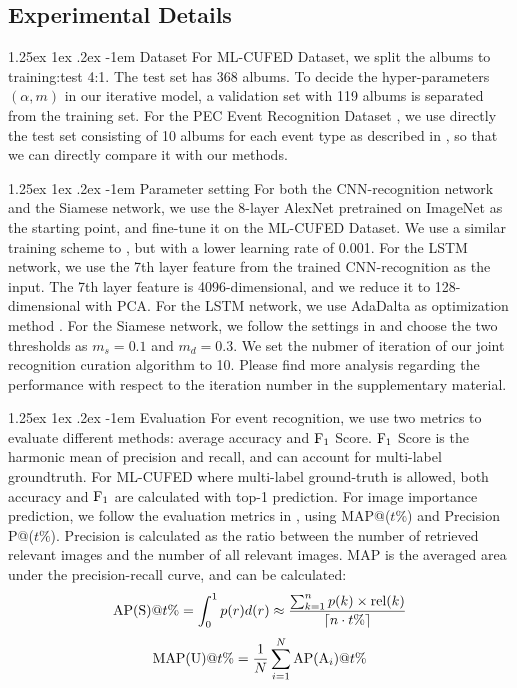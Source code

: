 \documentclass[runningheads]{llncs}
\makeatletter
\renewcommand\paragraph{\@startsection{paragraph}{4}{\z@}%
           {1.25ex \@plus1ex \@minus.2ex}%
           {-1em}%
           {\normalfont\normalsize\bfseries}}
\makeatother
\begin{document}
\subsection{Experimental Details}
\paragraph{Dataset} For ML-CUFED Dataset, we split the albums to training:test 4:1. The test set has 368 albums. To decide the hyper-parameters $(\alpha, m)$ in our iterative model, a validation set with 119 albums is separated from the training set.  For the PEC Event Recognition Dataset \cite{HMM}, we use directly the test set consisting of 10 albums for each event type as described in \cite{HMM}, so that we can directly compare it with our methods.

\paragraph{Parameter setting} For both the CNN-recognition network and the Siamese network, we use the 8-layer AlexNet \cite{imagenet} pretrained on ImageNet as the starting point, and fine-tune it on the ML-CUFED Dataset. We use a similar training scheme to \cite{caffe}, but with a lower learning rate of 0.001. For the LSTM network, we use the 7th layer feature from the trained CNN-recognition as the input. The 7th layer feature is 4096-dimensional, and we reduce it to 128-dimensional with PCA. For the LSTM network, we use AdaDalta as optimization method \cite{adadelta,theano1,theano2}. For the Siamese network, we follow the settings in \cite{CVPR} and choose the two thresholds as $m_{s} = 0.1$ and $m_{d}=0.3$. We set the nubmer of iteration of our joint recognition curation algorithm to 10. Please find more analysis regarding the performance with respect to the iteration number in the supplementary material.

\paragraph{Evaluation} For event recognition, we use two metrics to evaluate different methods: average accuracy and $\textup{F}_{1}$ Score.  $\textup{F}_{1}$ Score is the harmonic mean of precision and recall, and can account for multi-label groundtruth. For ML-CUFED where multi-label ground-truth is allowed, both accuracy and $\textup{F}_{1}$ are calculated with top-1 prediction. For image importance prediction, we follow the evaluation metrics in \cite{CVPR}, using MAP@($t\%$) and Precision P@($t\%$).  Precision is calculated as the ratio between the number of retrieved relevant images and the number of all relevant images. MAP is the averaged area under the precision-recall curve, and can be calculated:
\begin{equation}
\textup{AP(S)}@t\%=\int_{0}^{1}p(r)d(r)\approx \frac{\sum_{k=1}^{n}p(k)\times \textup{rel}(k)}{\left \lceil n\cdot t\% \right \rceil}
\end{equation}
\begin{equation}
\textup{MAP(U)}@t\% = \frac{1}{N}\sum_{i=1}^{N}\textup{AP}(\textup{A}_{i})@t\%
\end{equation}
\end{document}
